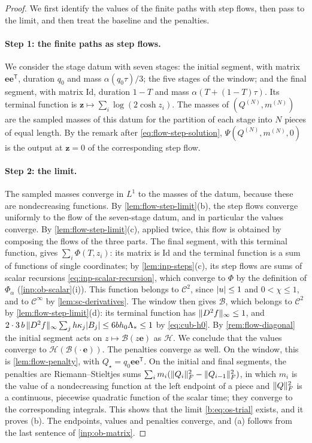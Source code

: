 \begin{proof}
We first identify the values of the finite paths with step flows, then pass to
the limit, and then treat the baseline and the penalties.

\paragraph{Step 1: the finite paths as step flows.} We consider the stage datum
with seven stages: the initial segment, with matrix $\mathbf e\mathbf
e^{\mathsf T}$, duration $q_0$ and mass $\alpha(q_0\tau)/3$; the five stages
of the window; and the final segment, with matrix $\mathrm{Id}$, duration $1-T$ and mass
$\alpha(T+(1-T)\tau)$. Its terminal function is
$\mathbf z\mapsto\sum_i\log(2\cosh z_i)$. The masses of $(Q^{(N)},m^{(N)})$ are the sampled
masses of this datum for the partition of each stage into $N$ pieces of equal
length. By the remark after \eqref{eq:flow-step-solution},
$\Psi(Q^{(N)},m^{(N)},0)$ is the output at $\mathbf z=0$ of the corresponding
step flow.

\paragraph{Step 2: the limit.} The sampled masses converge in $L^1$ to the
masses of the datum, because these are nondecreasing functions. By
\cref{lem:flow-step-limit}(b), the step flows converge uniformly to the flow of
the seven-stage datum, and in particular the values converge. By \cref{lem:flow-step-limit}(c),
applied twice, this flow is obtained by composing the flows of the three parts.
The final segment, with this terminal function, gives
$\sum_i\Phi(T,z_i)$: its matrix is $\mathrm{Id}$ and the terminal function is a sum of
functions of single coordinates; by \cref{lem:inp-steps}(c), its step flows are sums of
scalar recursions \eqref{eq:inp-scalar-recursion}, which converge to $\Phi$ by
the definition of $\Phi_\alpha$ (\cref{inp:ob-scalar}(i)). This function belongs
to $\mathcal C^2$, since $\lvert u\rvert\le1$ and $0<\chi\le1$, and to $\mathcal C^\infty$
by \cref{lem:sc-derivatives}. The window then gives
$\mathcal B$, which belongs to $\mathcal C^2$ by \cref{lem:flow-step-limit}(d):
its terminal function has $\lVert D^2f\rVert_\infty\le1$, and
$2\cdot3\,b\,\lVert D^2f\rVert_\infty\sum_jh\kappa_j\lvert B_j\rvert\le6bh_0\Lambda_*\le1$ by
\eqref{eq:cub-h0}. By \cref{rem:flow-diagonal} the initial
segment acts on $z\mapsto\mathcal B(z\mathbf e)$ as $\mathcal H$. We conclude
that the values converge to $\mathcal H(\mathcal B(\cdot\,\mathbf e))$. The penalties
converge as well. On the window, this is \cref{lem:flow-penalty}, with
$Q_\star=q_0\mathbf e\mathbf e^{\mathsf T}$. On the initial and final segments,
the penalties are Riemann--Stieltjes sums $\sum_im_i(\lVert Q_i\rVert_F^2
-\lVert Q_{i-1}\rVert_F^2)$, in which $m_i$ is the value of a nondecreasing function
at the left endpoint of a piece and $\lVert Q\rVert_F^2$ is a continuous, piecewise
quadratic function of the scalar time; they converge to the corresponding
integrals. This shows that the limit \eqref{b:eq:os-trial} exists, and it
proves (b). The endpoints, values and penalties converge, and (a) follows from the
last sentence of \cref{inp:ob-matrix}.


\end{proof}
